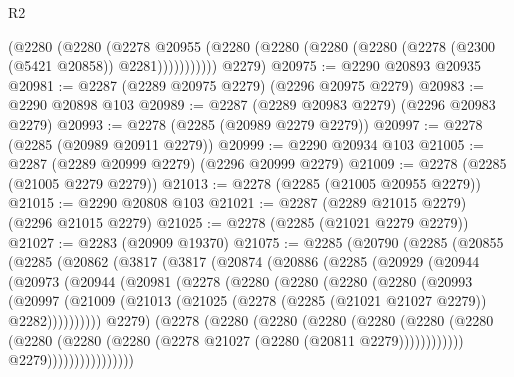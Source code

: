 \begin{lexlean}{R2}
\begin{coremodule}
            (@2280
              (@2280
                (@2278
                  @20955
                  (@2280 (@2280 (@2280 (@2280 (@2278 (@2300 (@5421 @20858)) @2281)))))))))))
      @2279)
@20975 := @2290 @20893 @20935
@20981 := @2287 (@2289 @20975 @2279) (@2296 @20975 @2279)
@20983 := @2290 @20898 @103
@20989 := @2287 (@2289 @20983 @2279) (@2296 @20983 @2279)
@20993 := @2278 (@2285 (@20989 @2279 @2279))
@20997 := @2278 (@2285 (@20989 @20911 @2279))
@20999 := @2290 @20934 @103
@21005 := @2287 (@2289 @20999 @2279) (@2296 @20999 @2279)
@21009 := @2278 (@2285 (@21005 @2279 @2279))
@21013 := @2278 (@2285 (@21005 @20955 @2279))
@21015 := @2290 @20808 @103
@21021 := @2287 (@2289 @21015 @2279) (@2296 @21015 @2279)
@21025 := @2278 (@2285 (@21021 @2279 @2279))
@21027 := @2283 (@20909 @19370)
@21075 := @2285
    (@20790
      (@2285
        (@20855
          (@2285
            (@20862
              (@3817
                (@3817
                  (@20874
                    (@20886
                      (@2285
                        (@20929
                          (@20944
                            (@20973
                              (@20944
                                (@20981
                                  (@2278
                                    (@2280
                                      (@2280
                                        (@2280
                                          (@2280
                                            (@20993
                                              (@20997
                                                (@21009
                                                  (@21013
                                                    (@21025
                                                      (@2278
                                                        (@2285 (@21021 @21027 @2279))
                                                        @2282))))))))))
                                    @2279)
                                  (@2278
                                    (@2280
                                      (@2280
                                        (@2280
                                          (@2280
                                            (@2280
                                              (@2280
                                                (@2280
                                                  (@2280
                                                    (@2280
                                                      (@2278 @21027 (@2280 (@20811 @2279))))))))))))
                                    @2279))))))))))))))))

\end{coremodule}
\end{lexlean}
